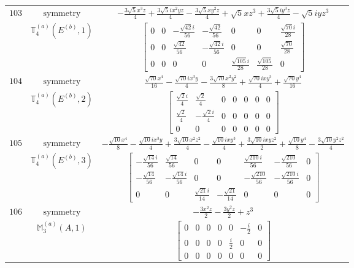 \documentclass[fleqn,8pt,landscape]{jsarticle}
\begin{document}
\begin{longtable}{ccc}
$ 103 $ & $ \text{symmetry} $ & $ - \frac{3 \sqrt{5} x^{3} z}{4} + \frac{3 \sqrt{5} i x^{2} y z}{4} - \frac{3 \sqrt{5} x y^{2} z}{4} + \sqrt{5} x z^{3} + \frac{3 \sqrt{5} i y^{3} z}{4} - \sqrt{5} i y z^{3} $ \\
$  $ & $ \mathbb{T}_{4}^{(a)}(E^{(b)},1) $ & $ \begin{bmatrix} 0 & 0 & - \frac{\sqrt{42} i}{56} & - \frac{\sqrt{42}}{56} & 0 & 0 & \frac{\sqrt{70} i}{28} \\ 0 & 0 & \frac{\sqrt{42}}{56} & - \frac{\sqrt{42} i}{56} & 0 & 0 & \frac{\sqrt{70}}{28} \\ 0 & 0 & 0 & 0 & \frac{\sqrt{105} i}{28} & \frac{\sqrt{105}}{28} & 0 \end{bmatrix} $ \\ \hline
$ 104 $ & $ \text{symmetry} $ & $ \frac{\sqrt{70} x^{4}}{16} - \frac{\sqrt{70} i x^{3} y}{4} - \frac{3 \sqrt{70} x^{2} y^{2}}{8} + \frac{\sqrt{70} i x y^{3}}{4} + \frac{\sqrt{70} y^{4}}{16} $ \\
$  $ & $ \mathbb{T}_{4}^{(a)}(E^{(b)},2) $ & $ \begin{bmatrix} \frac{\sqrt{2} i}{4} & \frac{\sqrt{2}}{4} & 0 & 0 & 0 & 0 & 0 \\ \frac{\sqrt{2}}{4} & - \frac{\sqrt{2} i}{4} & 0 & 0 & 0 & 0 & 0 \\ 0 & 0 & 0 & 0 & 0 & 0 & 0 \end{bmatrix} $ \\ \hline
$ 105 $ & $ \text{symmetry} $ & $ - \frac{\sqrt{10} x^{4}}{8} - \frac{\sqrt{10} i x^{3} y}{4} + \frac{3 \sqrt{10} x^{2} z^{2}}{4} - \frac{\sqrt{10} i x y^{3}}{4} + \frac{3 \sqrt{10} i x y z^{2}}{2} + \frac{\sqrt{10} y^{4}}{8} - \frac{3 \sqrt{10} y^{2} z^{2}}{4} $ \\
$  $ & $ \mathbb{T}_{4}^{(a)}(E^{(b)},3) $ & $ \begin{bmatrix} - \frac{\sqrt{14} i}{56} & \frac{\sqrt{14}}{56} & 0 & 0 & \frac{\sqrt{210} i}{56} & - \frac{\sqrt{210}}{56} & 0 \\ - \frac{\sqrt{14}}{56} & - \frac{\sqrt{14} i}{56} & 0 & 0 & - \frac{\sqrt{210}}{56} & - \frac{\sqrt{210} i}{56} & 0 \\ 0 & 0 & \frac{\sqrt{21} i}{14} & - \frac{\sqrt{21}}{14} & 0 & 0 & 0 \end{bmatrix} $ \\ \hline
$ 106 $ & $ \text{symmetry} $ & $ - \frac{3 x^{2} z}{2} - \frac{3 y^{2} z}{2} + z^{3} $ \\
$  $ & $ \mathbb{M}_{3}^{(a)}(A,1) $ & $ \begin{bmatrix} 0 & 0 & 0 & 0 & 0 & - \frac{i}{2} & 0 \\ 0 & 0 & 0 & 0 & \frac{i}{2} & 0 & 0 \\ 0 & 0 & 0 & 0 & 0 & 0 & 0 \end{bmatrix} $ \\ \hline

\end{longtable}
\end{document}
